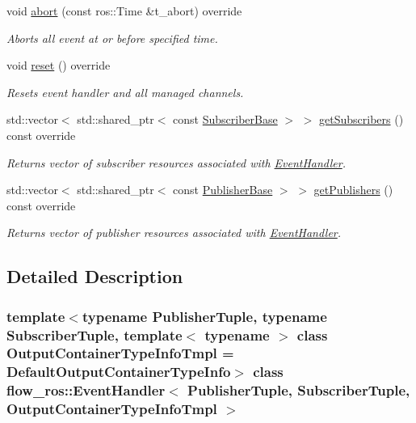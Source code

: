 \begin{DoxyCompactItemize}
void \hyperlink{classflow__ros_1_1_event_handler_a95200a36fc64725ac280c04c2697f709}{abort} (const ros\+::\+Time \&t\+\_\+abort) override
\begin{DoxyCompactList}\small\item\em Aborts all event at or before specified time. \end{DoxyCompactList}\item 
void \hyperlink{classflow__ros_1_1_event_handler_a4b9b96163817d60208a83476148562ff}{reset} () override
\begin{DoxyCompactList}\small\item\em Resets event handler and all managed channels. \end{DoxyCompactList}\item 
std\+::vector$<$ std\+::shared\+\_\+ptr$<$ const \hyperlink{classflow__ros_1_1_subscriber_base}{Subscriber\+Base} $>$ $>$ \hyperlink{classflow__ros_1_1_event_handler_ac91cf67be38d79d3d86a9aa6318eca53}{get\+Subscribers} () const override
\begin{DoxyCompactList}\small\item\em Returns vector of subscriber resources associated with \hyperlink{classflow__ros_1_1_event_handler}{Event\+Handler}. \end{DoxyCompactList}\item 
std\+::vector$<$ std\+::shared\+\_\+ptr$<$ const \hyperlink{classflow__ros_1_1_publisher_base}{Publisher\+Base} $>$ $>$ \hyperlink{classflow__ros_1_1_event_handler_ae786846cf4cf48b9b952265862e73ef1}{get\+Publishers} () const override
\begin{DoxyCompactList}\small\item\em Returns vector of publisher resources associated with \hyperlink{classflow__ros_1_1_event_handler}{Event\+Handler}. \end{DoxyCompactList}\end{DoxyCompactItemize}


\subsection{Detailed Description}
\subsubsection*{template$<$typename Publisher\+Tuple, typename Subscriber\+Tuple, template$<$ typename $>$ class Output\+Container\+Type\+Info\+Tmpl = Default\+Output\+Container\+Type\+Info$>$\newline
class flow\+\_\+ros\+::\+Event\+Handler$<$ Publisher\+Tuple, Subscriber\+Tuple, Output\+Container\+Type\+Info\+Tmpl $>$}

